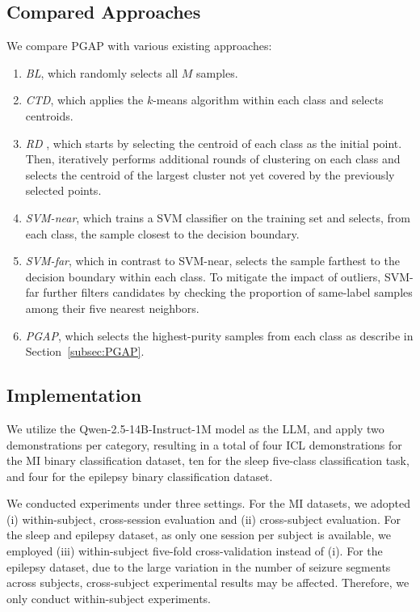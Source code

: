 \documentclass[journal,twocolumn]{IEEEtran}
\begin{document}
\subsection{Compared Approaches}
We compare PGAP with various existing approaches:
\begin{enumerate}
\item \emph{BL}, which randomly selects all $M$ samples.
\item \emph{CTD}, which applies the $k$-means algorithm within each class and selects centroids.
\item \emph{RD} \cite{wu2018pool}, which starts by selecting the centroid of each class as the initial point. Then, iteratively performs additional rounds of clustering on each class and selects the centroid of the largest cluster not yet covered by the previously selected points.
\item \emph{SVM-near}, which trains a SVM classifier on the training set and selects, from each class, the sample closest to the decision boundary.
\item \emph{SVM-far}, which in contrast to SVM-near, selects the sample farthest to the decision boundary within each class. To mitigate the impact of outliers, SVM-far further filters candidates by checking the proportion of same-label samples among their five nearest neighbors.
\item \emph{PGAP}, which selects the highest-purity samples from each class as describe in Section~\ref{subsec:PGAP}.
\end{enumerate}

\subsection{Implementation}
We utilize the Qwen-2.5-14B-Instruct-1M model as the LLM, and apply two demonstrations per category, resulting in a total of four ICL demonstrations for the MI binary classification dataset, ten for the sleep five-class classification task, and four for the epilepsy binary classification dataset.

We conducted experiments under three settings. For the MI datasets, we adopted (i) within-subject, cross-session evaluation and (ii) cross-subject evaluation. For the sleep and epilepsy dataset, as only one session per subject is available, we employed (iii) within-subject five-fold cross-validation instead of (i). For the epilepsy dataset, due to the large variation in the number of seizure segments across subjects, cross-subject experimental results may be affected. Therefore, we only conduct within-subject experiments.
\end{document}
